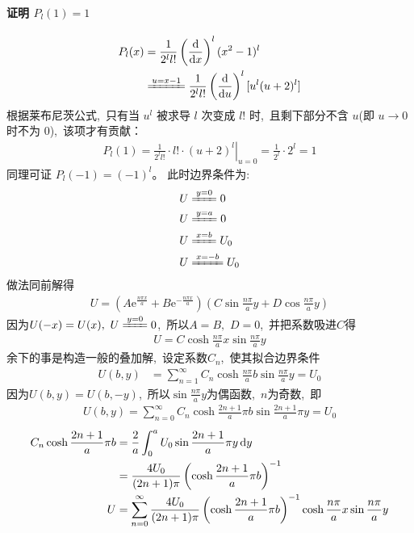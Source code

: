 \paragraph{证明 $P_l(1)=1$}
\begin{align*}
    P_l(x)&=\frac{1}{2^ll!}\left(\frac{\dif}{\dif x}\right)^l(x^2-1)^l\\
    &\xlongequal{u=x-1}\frac{1}{2^ll!}\left(\frac{\dif}{\dif u}\right)^l[u^l(u+2)^l]
\end{align*}
根据莱布尼茨公式, \,只有当 $u^l$ 被求导 $l$ 次变成 $l!$ 时, \,且剩下部分不含 $u$(即 $u \to 0$ 时不为 0), \,该项才有贡献：
\begin{align*}
    \left. P_l(1) = \frac{1}{2^l l!} \cdot l! \cdot (u+2)^l \right|_{u=0} = \frac{1}{2^l} \cdot 2^l = 1
\end{align*}
同理可证 $P_l(-1) = (-1)^l$。
此时边界条件为:
\begin{align*}
        U&\xlongequal{y=0}0\\
    U&\xlongequal{y=a}0\\
    U&\xlongequal{x=b}U_0\\
    U&\xlongequal{x=-b}U_0
\end{align*}
做法同前解得
\begin{align*}
    U=(A\mathrm{e}^{\frac{n\pi x}{a}}+B\mathrm{e}^{-\frac{n\pi x}{a}})(C\sin \frac{n\pi}{a}y+D\cos \frac{n\pi}{a}y)
\end{align*}
因为$U(-x)=U(x),\, \,U\xlongequal{y=0}0$, \,所以$A=B,\, \,D=0$, \,并把系数吸进$C$得
\begin{align*}
    U=C\cosh\frac{n\pi}{a} x\sin \frac{n\pi}{a}y
\end{align*}
余下的事是构造一般的叠加解, \,设定系数$C_n$, \,使其拟合边界条件
\begin{align*}
    U(b,y)&=\sum_{n=1}^{\infty}C_n\cosh\frac{n\pi}{a} b\sin \frac{n\pi}{a}y=U_0
\end{align*}
因为$U(b,y)=U(b,-y)$, \,所以$\sin \frac{n\pi}{a}y$为偶函数, \,$n$为奇数, \,即
\begin{align*}
    U(b,y)=\sum_{n=0}^{\infty}C_n\cosh\frac{2n+1}{a}\pi b\sin \frac{2n+1}{a}\pi y=U_0
\end{align*}
\begin{align*}
    C_n\cosh\frac{2n+1}{a}\pi b&=\frac{2}{a}\int_{0}^{a}U_0\sin \frac{2n+1}{a}\pi y\dif y\\
    &=\frac{4U_0}{(2n+1)\pi }\left(\cosh\frac{2n+1}{a}\pi b\right)^{-1}\\
    U&=\sum_{n=0}^{\infty}\frac{4U_0}{(2n+1)\pi }\left(\cosh\frac{2n+1}{a}\pi b\right)^{-1}\cosh\frac{n\pi}{a} x\sin \frac{n\pi}{a}y
\end{align*}
